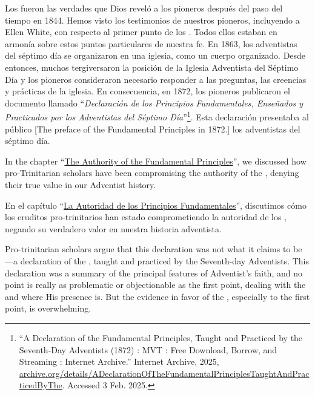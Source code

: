 Los  fueron las verdades que Dios reveló a los pioneros después del paso del tiempo en 1844. Hemos visto los testimonios de nuestros pioneros, incluyendo a Ellen White, con respecto al primer punto de los . Todos ellos estaban en armonía sobre estos puntos particulares de nuestra fe. En 1863, los adventistas del séptimo día se organizaron en una iglesia, como un cuerpo organizado. Desde entonces, muchos tergiversaron la posición de la Iglesia Adventista del Séptimo Día y los pioneros consideraron necesario responder a las preguntas,  las creencias y prácticas de la iglesia. En consecuencia, en 1872, los pioneros publicaron el documento llamado “\textit{Declaración de los Principios Fundamentales, Enseñados y Practicados por los Adventistas del Séptimo Día}”\footnote{“A Declaration of the Fundamental Principles, Taught and Practiced by the Seventh-Day Adventists (1872) : MVT : Free Download, Borrow, and Streaming : Internet Archive.” Internet Archive, 2025, \href{https://archive.org/details/ADeclarationOfTheFundamentalPrinciplesTaughtAndPracticedByThe}{archive.org/details/ADeclarationOfTheFundamentalPrinciplesTaughtAndPracticedByThe}. Accessed 3 Feb. 2025.}. Esta declaración presentaba al público [The preface of the Fundamental Principles in 1872.] los adventistas del séptimo día.


In the chapter “\hyperref[chap:authority]{The Authority of the Fundamental Principles}”, we discussed how pro-Trinitarian scholars have been compromising the authority of the , denying their true value in our Adventist history.


En el capítulo “\hyperref[chap:authority]{La Autoridad de los Principios Fundamentales}”, discutimos cómo los eruditos pro-trinitarios han estado comprometiendo la autoridad de los , negando su verdadero valor en nuestra historia adventista.


Pro-trinitarian scholars argue that this declaration was not what it claims to be—a declaration of the , taught and practiced by the Seventh-day Adventists. This declaration was a summary of the principal features of Adventist’s faith, and no point is really as problematic or objectionable as the first point, dealing with the  and where His presence is. But the evidence in favor of the , especially to the first point, is overwhelming.


